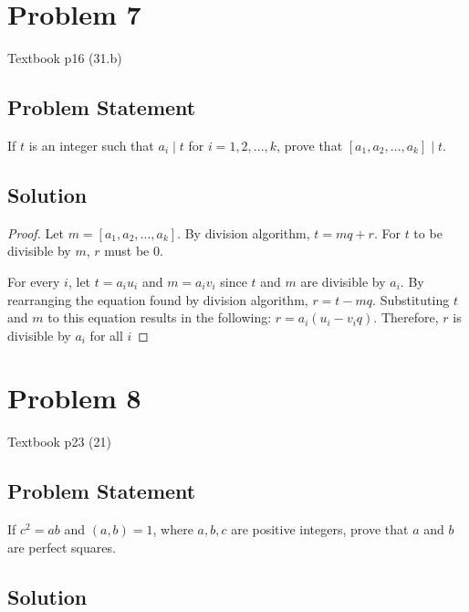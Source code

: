 \documentclass{article}
\begin{document}
\section*{Problem 7}

Textbook p16 (31.b)

\subsection*{Problem Statement}

If $t$ is an integer such that $a_i \mid t$ for $i = 1, 2, ... , k$, prove that $[a_1, a_2, \ldots, a_k] \mid t$.

\subsection*{Solution}

\begin{proof}
	Let $m = [a_1, a_2, \ldots, a_k]$. By division algorithm, $t = mq + r$. For $t$ to be divisible by $m$, $r$ must be 0.

	For every $i$, let $t = a_i u_i$ and $m = a_i v_i$ since $t$ and $m$ are divisible by $a_i$. By rearranging the equation found by division algorithm, $r = t - mq$. Substituting $t$ and $m$ to this equation results in the following: $r = a_i(u_i - v_i q)$. Therefore, $r$ is divisible by $a_i$ for all $i$
\end{proof}

\section*{Problem 8}

Textbook p23 (21)

\subsection*{Problem Statement}

If $c^2 = ab$ and $(a, b) = 1$, where $a, b, c$ are positive integers, prove that $a$ and $b$ are perfect squares.

\subsection*{Solution}
\end{document}

